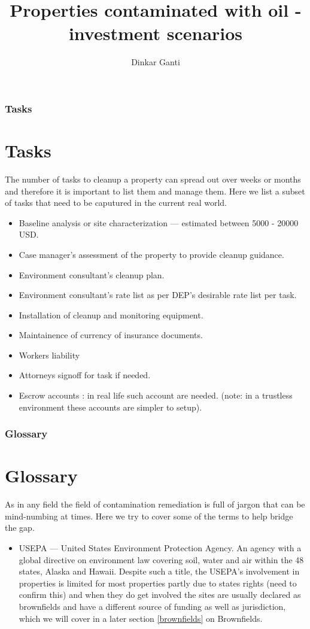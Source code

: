 \documentclass{beamer}
\title{Properties contaminated with oil - investment scenarios}
\author{Dinkar Ganti}
\begin{document}
\begin{frame}
  \titlepage
\end{frame}
\begin{frame}
\frametitle{Tasks}
\section{Tasks}
  The number of tasks to cleanup a property can spread out over weeks or months and therefore it is important to list them and manage them. Here we list a subset of tasks that need to be caputured in the current real world.
  \begin{itemize}
    \item Baseline analysis or site characterization --- estimated between 5000 - 20000 USD.
    \item Case manager's assessment of the property to provide cleanup guidance.
    \item Environment consultant's cleanup plan.
    \item Environment consultant's rate list as per DEP's desirable rate list per task. 
    \item Installation of cleanup and monitoring equipment.
    \item Maintainence of currency of insurance documents.
    \item Workers liability
    \item Attorneys signoff for task if needed.
    \item Escrow accounts : in real life such account are needed. (note: in a trustless environment these accounts are simpler to setup).
  \end{itemize}
\end{frame}
\begin{frame}
\frametitle {Glossary}
\section{Glossary}
As in any field the field of contamination remediation is full of jargon that can be mind-numbing at times. Here we try to cover some of the terms to help bridge the gap.
\begin{itemize}
  \item USEPA --- United States Environment Protection Agency. An agency with a global directive on environment law covering soil, water and air within the 48 states, Alaska and Hawaii. Despite such a title, the USEPA's involvement in properties is limited for most properties partly due to states rights (need to confirm this) and when they do get involved the sites are usually declared as brownfields and have a different source of funding as well as jurisdiction, which we will cover in a later section \ref{brownfields} on Brownfields.
\end{itemize}
\end{frame}
\end{document}
